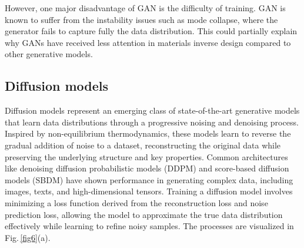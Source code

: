 \documentclass[fleqn,10pt]{wlscirep}
\begin{document}
However, one major disadvantage of GAN is the difficulty of training. GAN is known to suffer from the instability issues such as mode collapse, where the generator fails to capture fully the data distribution. This could partially explain why GANs have received less attention in materials inverse design compared to other generative models.

\subsection{Diffusion models}

Diffusion models represent an emerging class of state-of-the-art generative models that learn data distributions through a progressive noising and denoising process. Inspired by non-equilibrium thermodynamics, these models learn to reverse the gradual addition of noise to a dataset, reconstructing the original data while preserving the underlying structure and key properties. Common architectures like denoising diffusion probabilistic models (DDPM) and score-based diffusion models (SBDM) have shown performance in generating complex data, including images, texts, and high-dimensional tensors. Training a diffusion model involves minimizing a loss function derived from the reconstruction loss and noise prediction loss, allowing the model to approximate the true data distribution effectively while learning to refine noisy samples. The processes are visualized in Fig.\,\ref{fig6}(a).
\end{document}
